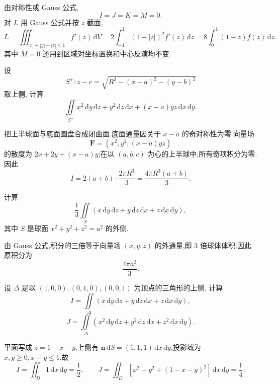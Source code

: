 \begin{solution}
    由对称性或 Gauss 公式,
    \[
        I=J=K=M=0.
    \]
    对 $L$ 用 Gauss 公式并按 $z$ 截面,
    \[
        L=\iiint_{|x|+|y|+|z|\leq1}f'(z)\,\mathrm{d}V
        =2\int_{-1}^1(1-|z|)^2f'(z)\,\mathrm{d}z
        =8\int_0^1(1-z)f(z)\,\mathrm{d}z.
    \]
    其中 $M=0$ 还用到区域对坐标置换和中心反演均不变.
\end{solution}

\begin{example}
    设
    \[
        S^+:z-c=\sqrt{R^2-(x-a)^2-(y-b)^2}
    \]
    取上侧, 计算
    \[
        \displaystyle\iint\limits_{S^+}x^2\,\mathrm{d}y\,\mathrm{d}z+y^2\,\mathrm{d}z\,\mathrm{d}x+(x-a)y z\,\mathrm{d}x\,\mathrm{d}y.
    \]
\end{example}
\exampleblank

\begin{solution}
    把上半球面与底面圆盘合成闭曲面.底面通量因关于 $x-a$ 的奇对称性为零.向量场
    \[
        \bm F=(x^2,y^2,(x-a)yz)
    \]
    的散度为 $2x+2y+(x-a)y$;在以 $(a,b,c)$ 为心的上半球中,所有奇项积分为零.因此
    \[
        I=2(a+b)\cdot\dfrac{2\pi R^3}{3}=\dfrac{4\pi R^3(a+b)}{3}.
    \]
\end{solution}

\begin{example}
    计算
    \[
        \dfrac{1}{3}\iint\limits_S(x\,\mathrm{d}y\,\mathrm{d}z+y\,\mathrm{d}z\,\mathrm{d}x+z\,\mathrm{d}x\,\mathrm{d}y),
    \]
    其中 $S$ 是球面 $x^2+y^2+z^2=a^2$ 的外侧.
\end{example}
\exampleblank

\begin{solution}
    由 Gauss 公式,积分的三倍等于向量场 $(x,y,z)$ 的外通量,即 $3$ 倍球体体积.因此原积分为
    \[
        \dfrac{4\pi a^3}{3}.
    \]
\end{solution}

\begin{example}
    设 $\Delta$ 是以 $(1,0,0),(0,1,0),(0,0,1)$ 为顶点的三角形的上侧, 计算
    \[
        I=\iint\limits_\Delta(x\,\mathrm{d}y\,\mathrm{d}z+y\,\mathrm{d}z\,\mathrm{d}x+z\,\mathrm{d}x\,\mathrm{d}y),
    \]
    \[
        J=\iint\limits_\Delta(x^2\,\mathrm{d}y\,\mathrm{d}z+y^2\,\mathrm{d}z\,\mathrm{d}x+z^2\,\mathrm{d}x\,\mathrm{d}y).
    \]
\end{example}
\exampleblank

\begin{solution}
    平面写成 $z=1-x-y$,上侧有
    $\bm n\,\mathrm{d}S=(1,1,1)\,\mathrm{d}x\,\mathrm{d}y$,投影域为 $x,y\geq0,x+y\leq1$.故
    \[
        I=\iint_D1\,\mathrm{d}x\,\mathrm{d}y=\dfrac{1}{2},
        \qquad
        J=\iint_D\left[x^2+y^2+(1-x-y)^2\right]\,\mathrm{d}x\,\mathrm{d}y=\dfrac{1}{4}.
    \]
\end{solution}

